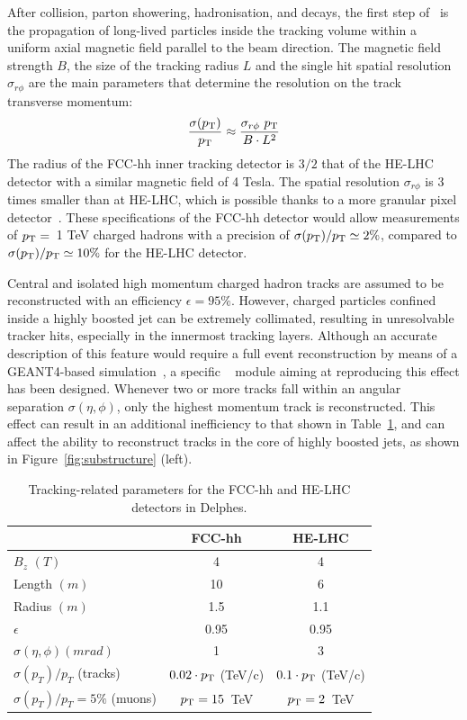 After collision, parton showering, hadronisation, and decays, the first step of \delphes{}~is the propagation of long-lived particles inside the tracking volume within a uniform axial magnetic field parallel to the beam direction. The magnetic field strength $B$, the size of the tracking radius $L$ and the single hit spatial resolution $\sigma_{r\phi}$ are the main parameters that determine the resolution on the track transverse momentum:
\begin{equation}
\frac{\sigma(p_{\text{T}})}{p_{\text{T}}} \approx \frac{\sigma_{r\phi}~ p_{\text{T}}}{B\cdot L^2}
\end{equation}
The radius of the FCC-hh inner tracking detector is $3/2$ that of the HE-LHC detector with a similar magnetic field of 4 Tesla.  The spatial resolution $\sigma_{r\phi}$ is 3 times smaller than at HE-LHC, which is possible thanks to a more granular pixel detector~\cite{CMS:2012sda}. These specifications of the FCC-hh detector would allow measurements of $p_{\text{T}}=$~1 TeV charged hadrons with a precision of $\sigma(p_{\text{T}})/p_{\text{T}}  \simeq 2\%$, compared to $\sigma(p_{\text{T}})/p_{\text{T}} \simeq 10\%$ for the HE-LHC detector. 

Central and isolated high momentum charged hadron tracks are assumed to be reconstructed with an efficiency $\epsilon = 95\%$. However, charged particles confined inside a highly boosted jet can be extremely collimated, resulting in unresolvable tracker hits, especially in the innermost tracking layers. Although an accurate description of this feature would require a full event reconstruction by means of a GEANT4-based simulation~\cite{Agostinelli:2002hh,Allison:2006ve,Allison:2016lfl}, a specific \delphes{}~ module aiming at reproducing this effect has been designed. Whenever two or more tracks fall within an angular separation $\sigma(\eta,\phi)$, only the highest momentum track is reconstructed. This effect can result in an additional inefficiency to that shown in Table~\ref{tab:trk_param}, and can affect the ability to reconstruct tracks in the core of highly boosted jets, as shown in Figure~\ref{fig:substructure} (left).

\begin {table}[htb!]
\begin{center}
\begin{tabular}{l||c|c}
& FCC-hh & HE-LHC \\
  \hline
  \hline
$B_z$ $(T)$ &  4 & 4 \\
  \hline
Length $(m)$ & 10 & 6 \\
 \hline
Radius $(m)$ & 1.5 &  1.1 \\
 \hline
$\epsilon$ & 0.95 & 0.95\\
\hline
$\sigma(\eta,\phi) (mrad) $ & 1  & 3  \\
\hline
$\sigma(p_T)/p_T$ (tracks) &  $0.02\cdot p_{\text{T}}$ (TeV/c) &  $0.1\cdot p_{\text{T}}$ (TeV/c)\\
\hline
$\sigma(p_T)/p_T=5\%$ (muons) & $p_{\text{T}}=15$~TeV & $p_{\text{T}}=2$~TeV\\

\end{tabular}
\caption{Tracking-related parameters for the FCC-hh and HE-LHC detectors in Delphes.}
\label{tab:trk_param}
\end{center}
\end{table}

